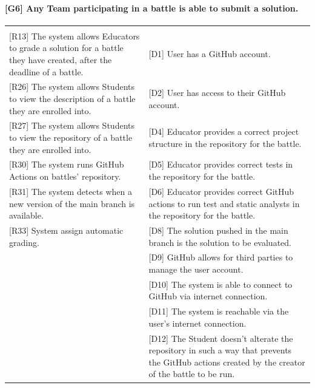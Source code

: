 \documentclass{article}
\begin{document}
\paragraph{[G6] Any Team participating in a battle is able to submit a solution.}
\begin{center}
\begin{tabular}{|m{20em}|m{20em}|}
\hline
& \\
{[R13]} The system allows Educators to grade a solution for a battle they have created, after the deadline of a battle. & 
{[D1]} User has a GitHub account.\\
{[R26]} The system allows Students to view the description of a battle they are enrolled into. & 
{[D2]} User has access to their GitHub account.\\
{[R27]} The system allows Students to view the repository of a battle they are enrolled into. & 
{[D4]} Educator provides a correct project structure in the repository for the battle.\\
{[R30]} The system runs GitHub Actions on battles' repository. & 
{[D5]} Educator provides correct tests in the repository for the battle.\\
{[R31]} The system detects when a new version of the main branch is available. & 
{[D6]} Educator provides correct GitHub actions to run test and static analysts in the repository for the battle.\\
{[R33]} System assign automatic grading. & 
{[D8]} The solution pushed in the main branch is the solution to be evaluated.\\
& {[D9]} GitHub allows for third parties to manage the user account. \\
& {[D10]} The system is able to connect to GitHub via internet connection. \\
& {[D11]} The system is reachable via the user’s internet connection. \\
& {[D12]} The Student doesn't alterate the repository in such a way that prevents the GitHub actions created by the creator of the battle to be run. \\

\hline
\end{tabular}
\end{center}
\end{document}
